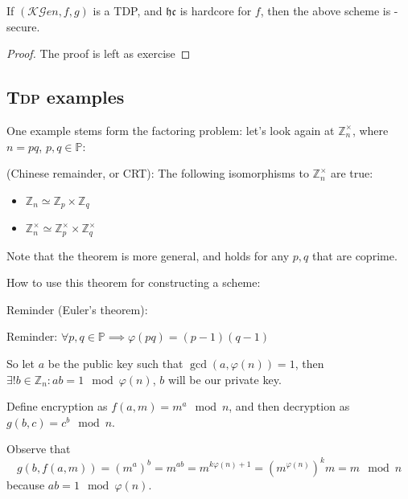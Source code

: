 \begin{theorem}
    If $(\mathcal{KG}en, f, g)$ is a TDP, and $\mathfrak{hc}$ is hardcore for $f$, then the above scheme is \cpa-secure.    
\end{theorem}

\begin{proof} The proof is left as exercise

\end{proof}

\subsection{\textsc{Tdp} examples}

One example stems form the factoring problem: let's look again at $\mathbb{Z}_n^\times$, where $n = pq$, $p, q \in \mathbb{P}$:

\begin{theorem}
    (Chinese remainder, or CRT): The following isomorphisms to $\mathbb{Z}_n^\times$ are true:

\begin{itemize}
    \item $\mathbb{Z}_n \simeq \mathbb{Z}_p \times \mathbb{Z}_q$
    \item $\mathbb{Z}_n^\times \simeq \mathbb{Z}_p^\times \times \mathbb{Z}_q^\times$
\end{itemize}

Note that the theorem is more general, and holds for any $p, q$ that are coprime.
\end{theorem}

How to use this theorem for constructing a \pke{} scheme:

Reminder (Euler's theorem):

Reminder: $\forall p, q \in \mathbb{P} \implies \varphi(pq) = (p-1)(q-1)$

So let $a$ be the public key such that $\gcd(a, \varphi(n))=1$, then $\exists! b
\in \mathbb{Z}_n : ab = 1 \mod \varphi(n)$, $b$ will be our private key.

Define encryption as $f(a, m) = m^a \mod n$, and then decryption as $g(b, c) =
c^b \mod n$.

Observe that 
\[
    g(b, f(a, m)) = (m^a)^b =m^{ab}=m^{k\varphi(n)+1}=(m^{\varphi(n)})^{k}m = m \mod n
\]
because $ab = 1 \mod \varphi(n)$.

